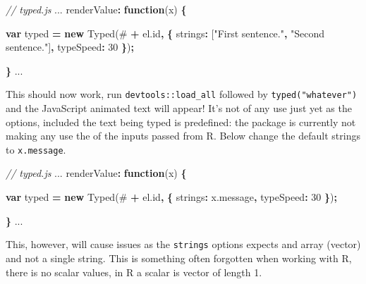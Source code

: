 \documentclass[
]{krantz}
\makeatletter
\newenvironment{Shaded}{\begin{snugshade}}{\end{snugshade}}
\newcommand{\AttributeTok}[1]{\textcolor[rgb]{0.61,0.61,0.61}{#1}}
\newcommand{\CommentTok}[1]{\textcolor[rgb]{0.37,0.37,0.37}{\textit{#1}}}
\newcommand{\DataTypeTok}[1]{\textcolor[rgb]{0.27,0.27,0.27}{#1}}
\newcommand{\DecValTok}[1]{\textcolor[rgb]{0.06,0.06,0.06}{#1}}
\newcommand{\KeywordTok}[1]{\textcolor[rgb]{0.27,0.27,0.27}{\textbf{#1}}}
\newcommand{\NormalTok}[1]{#1}
\newcommand{\OperatorTok}[1]{\textcolor[rgb]{0.43,0.43,0.43}{\textbf{#1}}}
\newcommand{\StringTok}[1]{\textcolor[rgb]{0.5,0.5,0.5}{#1}}
\newcommand{\VariableTok}[1]{\textcolor[rgb]{0,0,0}{#1}}
\newenvironment{kframe}{%
\medskip{}
\setlength{\fboxsep}{.8em}
 \def\at@end@of@kframe{}%
 \ifinner\ifhmode%
  \def\at@end@of@kframe{\end{minipage}}%
  \begin{minipage}{\columnwidth}%
 \fi\fi%
 \def\FrameCommand##1{\hskip\@totalleftmargin \hskip-\fboxsep
 \colorbox{shadecolor}{##1}\hskip-\fboxsep
     \hskip-\linewidth \hskip-\@totalleftmargin \hskip\columnwidth}%
 \MakeFramed {\advance\hsize-\width
   \@totalleftmargin\z@ \linewidth\hsize
   \@setminipage}}%
 {\par\unskip\endMakeFramed%
 \at@end@of@kframe}
\renewenvironment{Shaded}{\begin{kframe}}{\end{kframe}}
\makeatother
\begin{document}
\begin{Shaded}
\begin{Highlighting}[]
\CommentTok{// typed.js}
\NormalTok{...}
\NormalTok{renderValue}\OperatorTok{:} \KeywordTok{function}\NormalTok{(x) }\OperatorTok{\{}

  \KeywordTok{var}\NormalTok{ typed }\OperatorTok{=} \KeywordTok{new} \AttributeTok{Typed}\NormalTok{(}\StringTok{\textquotesingle{}\#\textquotesingle{}} \OperatorTok{+} \VariableTok{el}\NormalTok{.}\AttributeTok{id}\OperatorTok{,} \OperatorTok{\{}
    \DataTypeTok{strings}\OperatorTok{:}\NormalTok{ [}\StringTok{"First sentence."}\OperatorTok{,} \StringTok{"Second sentence."}\NormalTok{]}\OperatorTok{,}
    \DataTypeTok{typeSpeed}\OperatorTok{:} \DecValTok{30}
  \OperatorTok{\}}\NormalTok{)}\OperatorTok{;}

\OperatorTok{\}}
\NormalTok{...}
\end{Highlighting}
\end{Shaded}

This should now work, run \texttt{devtools::load\_all} followed by \texttt{typed("whatever")} and the JavaScript animated text will appear! It's not of any use just yet as the options, included the text being typed is predefined: the package is currently not making any use the of the inputs passed from R. Below change the default strings to \texttt{x.message}.

\begin{Shaded}
\begin{Highlighting}[]
\CommentTok{// typed.js}
\NormalTok{...}
\NormalTok{renderValue}\OperatorTok{:} \KeywordTok{function}\NormalTok{(x) }\OperatorTok{\{}

  \KeywordTok{var}\NormalTok{ typed }\OperatorTok{=} \KeywordTok{new} \AttributeTok{Typed}\NormalTok{(}\StringTok{\textquotesingle{}\#\textquotesingle{}} \OperatorTok{+} \VariableTok{el}\NormalTok{.}\AttributeTok{id}\OperatorTok{,} \OperatorTok{\{}
    \DataTypeTok{strings}\OperatorTok{:} \VariableTok{x}\NormalTok{.}\AttributeTok{message}\OperatorTok{,}
    \DataTypeTok{typeSpeed}\OperatorTok{:} \DecValTok{30}
  \OperatorTok{\}}\NormalTok{)}\OperatorTok{;}

\OperatorTok{\}}
\NormalTok{...}
\end{Highlighting}
\end{Shaded}

This, however, will cause issues as the \texttt{strings} options expects and array (vector) and not a single string. This is something often forgotten when working with R, there is no scalar values, in R a scalar is vector of length 1.
\end{document}
